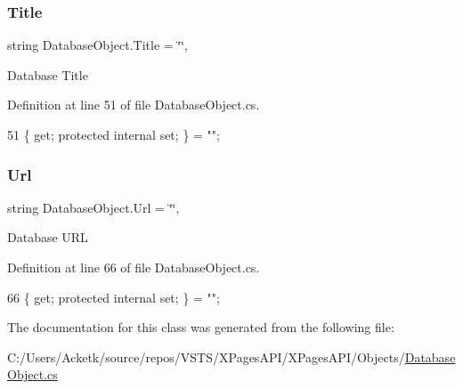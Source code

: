 \subsubsection{\texorpdfstring{Title}{Title}}
{\footnotesize\ttfamily string Database\+Object.\+Title = \char`\"{}\char`\"{}\hspace{0.3cm}{\ttfamily [get]}, {\ttfamily [set]}}



Database Title 



Definition at line 51 of file Database\+Object.\+cs.


\begin{DoxyCode}
51 \{ \textcolor{keyword}{get}; \textcolor{keyword}{protected} \textcolor{keyword}{internal} \textcolor{keyword}{set}; \} = \textcolor{stringliteral}{""};
\end{DoxyCode}
\mbox{\label{class_database_object_a12da011e3dc03d3a10ac86df10c84f48}} 
\subsubsection{\texorpdfstring{Url}{Url}}
{\footnotesize\ttfamily string Database\+Object.\+Url = \char`\"{}\char`\"{}\hspace{0.3cm}{\ttfamily [get]}, {\ttfamily [set]}}



Database U\+RL 



Definition at line 66 of file Database\+Object.\+cs.


\begin{DoxyCode}
66 \{ \textcolor{keyword}{get}; \textcolor{keyword}{protected} \textcolor{keyword}{internal} \textcolor{keyword}{set}; \} = \textcolor{stringliteral}{""};
\end{DoxyCode}


The documentation for this class was generated from the following file\+:\begin{DoxyCompactItemize}
\item 
C\+:/\+Users/\+Acketk/source/repos/\+V\+S\+T\+S/\+X\+Pages\+A\+P\+I/\+X\+Pages\+A\+P\+I/\+Objects/\mbox{\hyperlink{_database_object_8cs}{Database\+Object.\+cs}}\end{DoxyCompactItemize}
